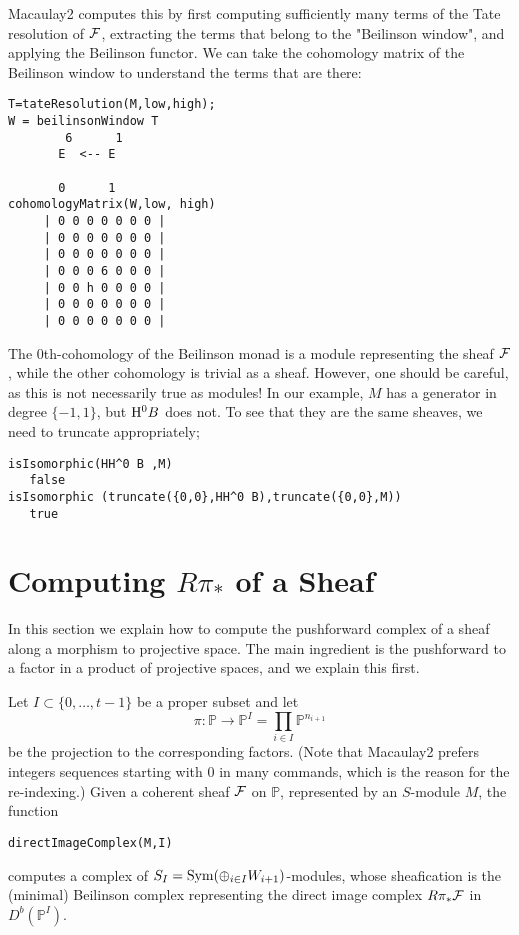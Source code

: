 \documentclass[twoside,12pt, leqno]{amsart}
\def\PP{{\mathbb P}}
\begin{document}
Macaulay2 computes this by first computing sufficiently many terms of the Tate resolution
of ${\mathcal F}$, extracting  the terms
that belong to the "Beilinson window", and  applying the Beilinson functor.
We can take the cohomology matrix of the Beilinson window to understand
the terms that are there:
{\small
\begin{verbatim}
T=tateResolution(M,low,high);
W = beilinsonWindow T
        6      1
       E  <-- E
               
       0      1
cohomologyMatrix(W,low, high)
     | 0 0 0 0 0 0 0 |
     | 0 0 0 0 0 0 0 |
     | 0 0 0 0 0 0 0 |
     | 0 0 0 6 0 0 0 |
     | 0 0 h 0 0 0 0 |
     | 0 0 0 0 0 0 0 |
     | 0 0 0 0 0 0 0 |
 \end{verbatim}}

The 0th-cohomology of the Beilinson monad is a module representing the sheaf ${\mathcal F}$,
while the other cohomology is trivial as a sheaf. However, one should be careful, 
as this is not necessarily true as modules!
 In our example, $M$ has a generator in degree $\{-1,1\}$, but ${\rm H}^0 B$ does not.
To see that they are the same sheaves, we need to truncate appropriately;
{\small
\begin{verbatim}
isIsomorphic(HH^0 B ,M)
   false
isIsomorphic (truncate({0,0},HH^0 B),truncate({0,0},M))
   true
\end{verbatim}}


\section{Computing $R\pi_*$ of a Sheaf}\label{sec:push forward}

In this section we explain how to compute the pushforward complex of a sheaf along a morphism
to projective space. The main ingredient is the pushforward to a factor in a product of projective
spaces, and we explain this first.

Let $I \subset \{0,\ldots,t-1 \}$ be a proper subset and let
$$ \pi \colon\PP \to  \PP^I=\prod_{i \in  I} \PP^{n_{i+1}}$$
be the projection to the corresponding factors. (Note that Macaulay2 prefers integers sequences starting with $0$ in many commands, which is the reason for the re-indexing.) Given a coherent sheaf ${\mathcal F}$ on $\PP$, represented by an $S$-module $M$,
the function
{\small \begin{verbatim}
directImageComplex(M,I)
\end{verbatim}}
\noindent computes a complex of $S_I = \operatorname{Sym} (\oplus_{i \in I} W_{i+1})$-modules, whose sheafication
is the (minimal) Beilinson complex representing the direct image complex $R\pi_* {\mathcal F}$ in $D^b(\PP^I)$. 
\end{document}
